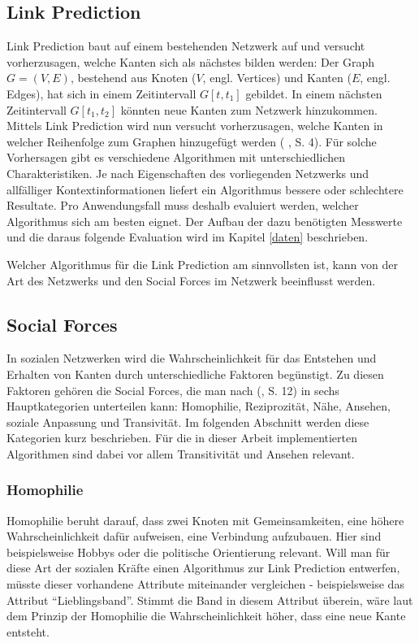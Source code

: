 \subsection{Link Prediction}
Link Prediction baut auf einem bestehenden Netzwerk auf und versucht vorherzusagen, welche Kanten sich als nächstes bilden werden:
Der Graph $G = (V, E)$, bestehend aus Knoten ($V$, engl. Vertices) und Kanten ($E$, engl. Edges), hat sich in einem Zeitintervall $G[t, t_1]$ gebildet.
In einem nächsten Zeitintervall $G[t_1, t_2]$ könnten neue Kanten zum Netzwerk hinzukommen.
Mittels Link Prediction wird nun versucht vorherzusagen, welche Kanten in welcher Reihenfolge zum Graphen hinzugefügt werden (\citeauthor{gao_link_2015} \citeyear{gao_link_2015}, S. 4).
Für solche Vorhersagen gibt es verschiedene Algorithmen mit unterschiedlichen Charakteristiken.
Je nach Eigenschaften des vorliegenden Netzwerks und allfälliger Kontextinformationen liefert ein Algorithmus bessere oder schlechtere Resultate.
Pro Anwendungsfall muss deshalb evaluiert werden, welcher Algorithmus sich am besten eignet.
Der Aufbau der dazu benötigten Messwerte und die daraus folgende Evaluation wird im Kapitel \ref{daten} beschrieben.

Welcher Algorithmus für die Link Prediction am sinnvollsten ist, kann von der Art des Netzwerks und den Social Forces im Netzwerk beeinflusst werden.

\subsection{Social Forces}
\label{socialforces}
In sozialen Netzwerken wird die Wahrscheinlichkeit für das Entstehen und Erhalten von Kanten durch unterschiedliche
Faktoren begünstigt. Zu diesen Faktoren gehören die Social Forces, die man nach \citeauthor{michael_henninger_soziale_2018} (\citeyear{michael_henninger_soziale_2018}, S. 12) in sechs Hauptkategorien unterteilen kann: Homophilie,
Reziprozität, Nähe, Ansehen, soziale Anpassung und Transivität. Im folgenden Abschnitt werden diese Kategorien kurz
beschrieben. Für die in dieser Arbeit implementierten Algorithmen sind dabei vor allem Transitivität und Ansehen
relevant.

\subsubsection{Homophilie}
Homophilie beruht darauf, dass zwei Knoten mit Gemeinsamkeiten, eine höhere Wahrscheinlichkeit dafür
aufweisen, eine Verbindung aufzubauen. Hier sind beispielsweise Hobbys oder die politische Orientierung relevant. Will
man für diese Art der sozialen Kräfte einen Algorithmus zur Link Prediction entwerfen, müsste dieser vorhandene
Attribute miteinander vergleichen - beispielsweise das Attribut ``Lieblingsband''. Stimmt die Band in diesem Attribut
überein, wäre laut dem Prinzip der Homophilie die Wahrscheinlichkeit höher, dass eine neue Kante entsteht.


